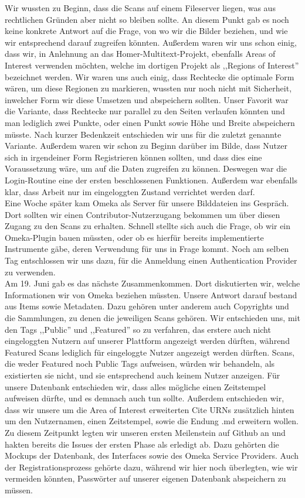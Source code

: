 \documentclass{article}
\begin{document}
Wir wussten zu Beginn, dass die Scans auf einem Fileserver liegen, was aus rechtlichen Gründen aber nicht so bleiben sollte. An diesem Punkt gab es noch keine konkrete Antwort auf die Frage, von wo wir die Bilder beziehen, und wie wir entsprechend darauf zugreifen könnten. Außerdem waren wir uns schon einig, dass wir, in Anlehnung an das Homer-Multitext-Projekt, ebenfalls Areas of Interest verwenden möchten, welche im dortigen Projekt als ,,Regions of Interest'' bezeichnet werden. Wir waren uns auch einig, dass Rechtecke die optimale Form wären, um diese Regionen zu markieren, wussten nur noch nicht mit Sicherheit, inwelcher Form wir diese Umsetzen und abspeichern sollten. Unser Favorit war die Variante, dass Rechtecke nur parallel zu den Seiten verlaufen könnten und man lediglich zwei Punkte, oder einen Punkt sowie Höhe und Breite abspeichern müsste. Nach kurzer Bedenkzeit entschieden wir uns für die zuletzt genannte Variante. Außerdem waren wir schon zu Beginn darüber im Bilde, dass Nutzer sich in irgendeiner Form Registrieren können sollten, und dass dies eine Voraussetzung wäre, um auf die Daten zugreifen zu können. Deswegen war die Login-Routine eine der ersten beschlossenen Funktionen. Außerdem war ebenfalls klar, dass Arbeit nur im eingeloggten Zustand verrichtet werden darf. \\
Eine Woche später kam Omeka als Server für unsere Bilddateien ins Gespräch. Dort sollten wir einen Contributor-Nutzerzugang bekommen um über diesen Zugang zu den Scans zu erhalten. Schnell stellte sich auch die Frage, ob wir ein Omeka-Plugin bauen müssten, oder ob es hierfür bereits implementierte Instrumente gäbe, deren Verwendung für uns in Frage kommt. Noch am selben Tag entschlossen wir uns dazu, für die Anmeldung einen Authentication Provider zu verwenden. \\
Am 19. Juni gab es das nächste Zusammenkommen. Dort diskutierten wir, welche Informationen wir von Omeka beziehen müssten. Unsere Antwort darauf bestand aus Items sowie Metadaten. Dazu gehören unter anderem auch Copyrights und die Sammlungen, zu denen die jeweiligen Scans gehören. Wir entschieden uns, mit den Tags ,,Public'' und ,,Featured'' so zu verfahren, das erstere auch nicht eingeloggten Nutzern auf unserer Plattform angezeigt werden dürften, während Featured Scans lediglich für eingeloggte Nutzer angezeigt werden dürften. Scans, die weder Featured noch Public Tags aufweisen, würden wir behandeln, als existierten sie nicht, und sie entsprechend auch keinem Nutzer anzeigen. Für unsere Datenbank entschieden wir, dass alles mögliche einen Zeitstempel aufweisen dürfte, und es demnach auch tun sollte. Außerdem entschieden wir, dass wir unsere um die Area of Interest erweiterten Cite URNs zusätzlich hinten um den Nutzernamen, einen Zeitstempel, sowie die Endung .md erweitern wollen. Zu diesem Zeitpunkt legten wir unseren ersten Meilenstein auf Github an und hakten bereits die Issues der ersten Phase als erledigt ab. Dazu gehörten die Mockups der Datenbank, des Interfaces sowie des Omeka Service Providers. Auch der Registrationsprozess gehörte dazu, während wir hier noch überlegten, wie wir vermeiden könnten, Passwörter auf unserer eigenen Datenbank abspeichern zu müssen. \\
\end{document}
